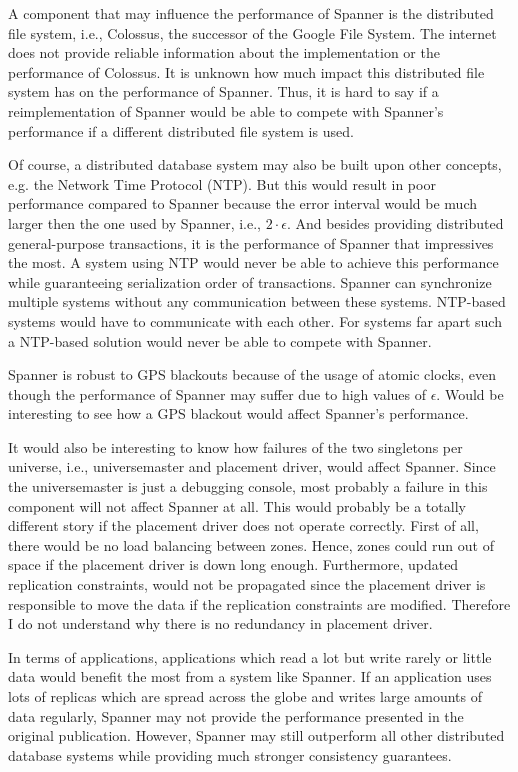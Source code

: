 \documentclass[onecolumn, a4paper, 10pt]{article}
\begin{document}
A component that may influence the performance of Spanner is the distributed
file system, i.e., Colossus, the successor of the Google File System. The internet 
does not provide reliable information about the implementation or the performance
of Colossus. It is unknown how much impact this distributed file system has on the
performance of Spanner. Thus, it is hard to say if a reimplementation of Spanner
would be able to compete with Spanner's performance if a different distributed
file system is used.

Of course, a distributed database system may also be built upon other concepts,
e.g. the Network Time Protocol (NTP). But this would result in poor performance
compared to Spanner because the error interval would be much larger then the one
used by Spanner, i.e., $2\cdot\epsilon$. And besides providing distributed
general-purpose transactions, it is the performance of Spanner that impressives
the most. A system using NTP would never be able to achieve this performance
while guaranteeing serialization order of transactions. Spanner can synchronize
multiple systems without any communication between these systems. NTP-based
systems would have to communicate with each other. For systems far apart such a
NTP-based solution would never be able to compete with Spanner.

Spanner is robust to GPS blackouts because of the usage of atomic clocks, even
though the performance of Spanner may suffer due to high values of $\epsilon$.
Would be interesting to see how a GPS blackout would affect Spanner's performance.

It would also be interesting to know how failures of the two singletons per
universe, i.e., universemaster and placement driver, would affect Spanner. Since
the universemaster is just a debugging console, most probably a failure in this
component will not affect Spanner at all. This would probably be a totally
different story if the placement driver does not operate correctly. First of all,
there would be no load balancing between zones. Hence, zones could run out of
space if the placement driver is down long enough. Furthermore, updated
replication constraints, would not be propagated since the placement driver is
responsible to move the data if the replication constraints are modified.
Therefore I do not understand why there is no redundancy in placement driver.

In terms of applications, applications which read a lot but write rarely or little
data would benefit the most from a system like Spanner. If an application uses
lots of replicas which are spread across the globe and writes large amounts of data
regularly, Spanner may not provide the performance presented in the original
publication. However, Spanner may still outperform all other distributed database
systems while providing much stronger consistency guarantees.



\end{document}
